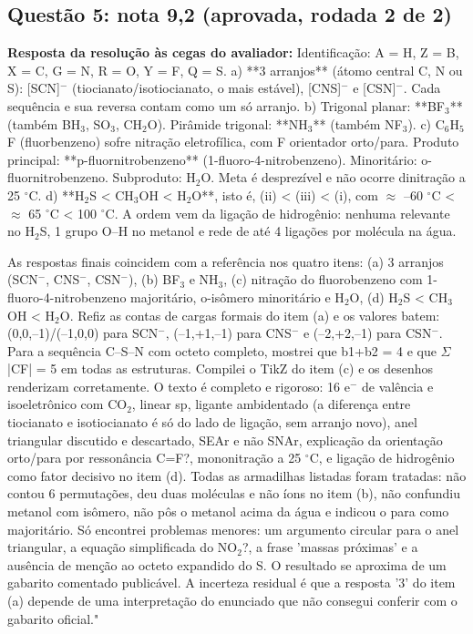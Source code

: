 \documentclass{article}%
\begin{document}
\subsection*{Questão 5: nota 9,2 (aprovada, rodada 2 de 2)}%
\textbf{Resposta da resolução às cegas do avaliador:} Identificação: A = H, Z = B, X = C, G = N, R = O, Y = F, Q = S.\newline%
\newline%
a) **3 arranjos** (átomo central C, N ou S): {[}SCN{]}$^{-}$ (tiocianato/isotiocianato, o mais estável), {[}CNS{]}$^{-}$ e {[}CSN{]}$^{-}$. Cada sequência e sua reversa contam como um só arranjo.\newline%
\newline%
b) Trigonal planar: **BF$_{3}$** (também BH$_{3}$, SO$_{3}$, CH$_{2}$O). Pirâmide trigonal: **NH$_{3}$** (também NF$_{3}$).\newline%
\newline%
c) C$_{6}$H$_{5}$F (fluorbenzeno) sofre nitração eletrofílica, com F orientador orto/para. Produto principal: **p{-}fluornitrobenzeno** (1{-}fluoro{-}4{-}nitrobenzeno). Minoritário: o{-}fluornitrobenzeno. Subproduto: H$_{2}$O. Meta é desprezível e não ocorre dinitração a 25 $^\circ$C.\newline%
\newline%
d) **H$_{2}$S < CH$_{3}$OH < H$_{2}$O**, isto é, (ii) < (iii) < (i), com $\approx$ --60 $^\circ$C < $\approx$ 65 $^\circ$C < 100 $^\circ$C. A ordem vem da ligação de hidrogênio: nenhuma relevante no H$_{2}$S, 1 grupo O--H no metanol e rede de até 4 ligações por molécula na água.\par %
As respostas finais coincidem com a referência nos quatro itens: (a) 3 arranjos (SCN$^{-}$, CNS$^{-}$, CSN$^{-}$), (b) BF$_{3}$ e NH$_{3}$, (c) nitração do fluorobenzeno com 1{-}fluoro{-}4{-}nitrobenzeno majoritário, o{-}isômero minoritário e H$_{2}$O, (d) H$_{2}$S < CH$_{3}$OH < H$_{2}$O. Refiz as contas de cargas formais do item (a) e os valores batem: (0,0,--1)/(--1,0,0) para SCN$^{-}$, (--1,+1,--1) para CNS$^{-}$ e (--2,+2,--1) para CSN$^{-}$. Para a sequência C--S--N com octeto completo, mostrei que b1+b2 = 4 e que $\Sigma$|CF| = 5 em todas as estruturas. Compilei o TikZ do item (c) e os desenhos renderizam corretamente. O texto é completo e rigoroso: 16 e$^{-}$ de valência e isoeletrônico com CO$_{2}$, linear sp, ligante ambidentado (a diferença entre tiocianato e isotiocianato é só do lado de ligação, sem arranjo novo), anel triangular discutido e descartado, SEAr e não SNAr, explicação da orientação orto/para por ressonância C=F?, mononitração a 25 $^\circ$C, e ligação de hidrogênio como fator decisivo no item (d). Todas as armadilhas listadas foram tratadas: não contou 6 permutações, deu duas moléculas e não íons no item (b), não confundiu metanol com isômero, não pôs o metanol acima da água e indicou o para como majoritário. Só encontrei problemas menores: um argumento circular para o anel triangular, a equação simplificada do NO$_{2}$?, a frase 'massas próximas' e a ausência de menção ao octeto expandido do S. O resultado se aproxima de um gabarito comentado publicável. A incerteza residual é que a resposta '3' do item (a) depende de uma interpretação do enunciado que não consegui conferir com o gabarito oficial."%
\end{document}
